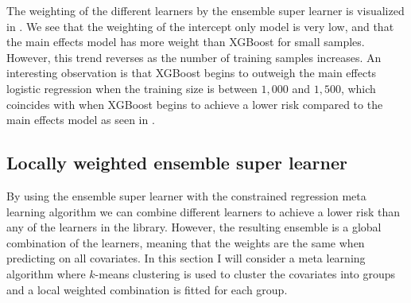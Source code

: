 \documentclass[./main.tex]{subfiles}
\begin{document}
The weighting of the different learners by the ensemble super learner is visualized in . We see that the weighting of the intercept only model is very low, and that the main effects model has more weight than XGBoost for small samples. However, this trend reverses as the number of training samples increases. An interesting observation is that XGBoost begins to outweigh the main effects logistic regression when the training size is between $ 1,000 $ and $ 1,500 $, which coincides with when XGBoost begins to achieve a lower risk compared to the main effects model as seen in .

\subsection{Locally weighted ensemble super learner} \label{locally_weighted_ensemble_super_learner}
By using the ensemble super learner with the constrained regression meta learning algorithm we can combine different learners to achieve a lower risk than any of the learners in the library. However, the resulting ensemble is a global combination of the learners, meaning that the weights are the same when predicting on all covariates. In this section I will consider a meta learning algorithm where $ k $-means clustering is used to cluster the covariates into groups and a local weighted combination is fitted for each group.
\end{document}
